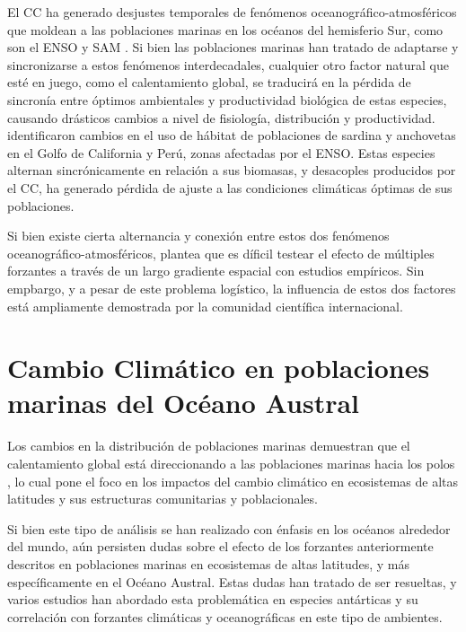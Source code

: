\documentclass{umagthesis}
\begin{document}
El CC ha generado desjustes temporales de fenómenos oceanográfico-atmosféricos que moldean a las poblaciones marinas en los océanos del hemisferio Sur, como son el ENSO y SAM \autocite{Saba2014,Morley2020,Lovenduski2005}. Si bien las poblaciones marinas han tratado de adaptarse y sincronizarse a estos fenómenos interdecadales, cualquier otro factor natural que esté en juego, como el calentamiento global, se traducirá en la pérdida de sincronía entre óptimos ambientales y productividad biológica de estas especies, causando drásticos cambios a nivel de fisiología, distribución y productividad. \autocite{Barange2014} identificaron cambios en el uso de hábitat de poblaciones de sardina y anchovetas en el Golfo de California y Perú, zonas afectadas por el ENSO. Estas especies alternan sincrónicamente en relación a sus biomasas, y desacoples producidos por el CC, ha generado pérdida de ajuste a las condiciones climáticas óptimas de sus poblaciones.

Si bien existe cierta alternancia y conexión entre estos dos fenómenos oceanográfico-atmosféricos, \autocite{Ehrnsten2019} plantea que es díficil testear el efecto de múltiples forzantes a través de un largo gradiente espacial con estudios empíricos. Sin empbargo, y a pesar de este problema logístico, la influencia de estos dos factores está ampliamente demostrada por la comunidad científica internacional.

\hypertarget{cambio-climuxe1tico-en-poblaciones-marinas-del-ocuxe9ano-austral}{%
\section{Cambio Climático en poblaciones marinas del Océano Austral}\label{cambio-climuxe1tico-en-poblaciones-marinas-del-ocuxe9ano-austral}}

Los cambios en la distribución de poblaciones marinas demuestran que el calentamiento global está direccionando a las poblaciones marinas hacia los polos \autocite{Perry2005,Parmesan2003}, lo cual pone el foco en los impactos del cambio climático en ecosistemas de altas latitudes y sus estructuras comunitarias y poblacionales.

Si bien este tipo de análisis se han realizado con énfasis en los océanos alrededor del mundo, aún persisten dudas sobre el efecto de los forzantes anteriormente descritos en poblaciones marinas en ecosistemas de altas latitudes, y más específicamente en el Océano Austral. Estas dudas han tratado de ser resueltas, y varios estudios han abordado esta problemática en especies antárticas y su correlación con forzantes climáticas y oceanográficas en este tipo de ambientes.
\end{document}
